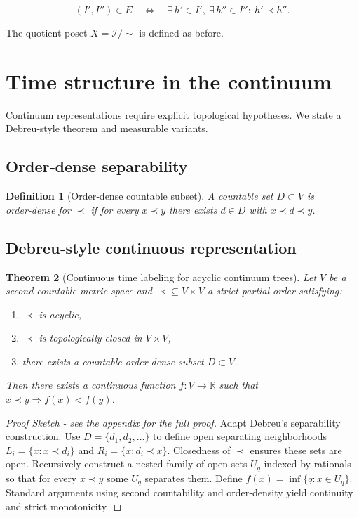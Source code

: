 \documentclass[11pt]{article}
\newtheorem{definition}{Definition}[section]
\newtheorem{theorem}[definition]{Theorem}
\begin{document}
\[
(I',I'')\in E \quad\Longleftrightarrow\quad \exists\,h'\in I',\ \exists\,h''\in I'':\ h'\prec h''.
\]


The quotient poset \(X=\mathcal I/\!\sim\) is defined as before.

\section{Time structure in the continuum}\label{sec:continuum_time}
Continuum representations require explicit topological hypotheses. We
state a Debreu‑style theorem and measurable variants.

\subsection{Order‑dense separability}
\begin{definition}[Order‑dense countable subset]
A countable set \(D\subset V\) is \emph{order‑dense} for \(\prec\) if for
every \(x\prec y\) there exists \(d\in D\) with \(x\prec d\prec y\).
\end{definition}

\subsection{Debreu‑style continuous representation}
\begin{theorem}[Continuous time labeling for acyclic continuum trees]\label{thm:debure_continuum}
Let \(V\) be a second‑countable metric space and \(\prec\subseteq V\times V\)
a strict partial order satisfying:
\begin{enumerate}[leftmargin=*]
  \item \(\prec\) is acyclic,
  \item \(\prec\) is topologically closed in \(V\times V\),
  \item there exists a countable order‑dense subset \(D\subset V\).
\end{enumerate}
Then there exists a continuous function \(f:V\to\mathbb R\) such that
\(x\prec y\Rightarrow f(x)<f(y)\).
\end{theorem}

\begin{proof}[Proof Sketch - see the appendix for the full proof]
Adapt Debreu's separability construction. Use \(D=\{d_1,d_2,\dots\}\) to
define open separating neighborhoods \(L_i=\{x:x\prec d_i\}\) and
\(R_i=\{x:d_i\prec x\}\). Closedness of \(\prec\) ensures these sets are
open. Recursively construct a nested family of open sets \(U_q\) indexed
by rationals so that for every \(x\prec y\) some \(U_q\) separates them.
Define \(f(x)=\inf\{q:x\in U_q\}\). Standard arguments using second
countability and order‑density yield continuity and strict monotonicity.
\end{proof}
\end{document}
